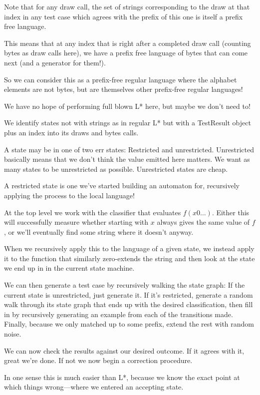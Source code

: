 \documentclass[a4paper]{book}
\begin{document}
Note that for any draw call,
the set of strings corresponding to the draw at that index in any test case which agrees with the prefix of this one is itself a prefix free language.

This means that at any index that is right after a completed draw call (counting bytes as draw calls here),
we have a prefix free language of bytes that can come next (and a generator for them!).

So we can consider this as a prefix-free regular language where the alphabet elements are not bytes,
but are themselves other prefix-free regular languages!

We have no hope of performing full blown L* here,
but maybe we don't need to!

We identify states not with strings as in regular L* but with a TestResult object plus an index into its draws and bytes calls.

A state may be in one of two err states:
Restricted and unrestricted.
Unrestricted basically means that we don't think the value emitted here matters.
We want as many states to be unrestricted as possible.
Unrestricted states are cheap.

A restricted state is one we've started building an automaton for,
recursively applying the process to the local language!

At the top level we work with the classifier that evaluates \(f(x0\ldots)\).
Either this will successfully measure whether starting with \(x\) always gives the same value of \(f\),
or we'll eventually find some string where it doesn't anyway.

When we recursively apply this to the language of a given state,
we instead apply it to the function that similarly zero-extends the string and then look at the state we end up in in the current state machine.

We can then generate a test case by recursively walking the state graph:
If the current state is unrestricted,
just generate it.
If it's restricted,
generate a random walk through its state graph that ends up with the desired classification,
then fill in by recursively generating an example from each of the transitions made.
Finally, because we only matched up to some prefix, extend the rest with random noise.

We can now check the results against our desired outcome.
If it agrees with it, great we're done.
If not we now begin a correction procedure.

In one sense this is much easier than L*,
because we know the exact point at which things wrong---where
we entered an accepting state.
\end{document}
